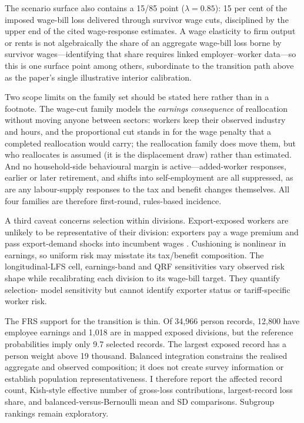 The scenario surface also contains a 15/85 point ($\lambda=0.85$): 15 per cent of the imposed wage-bill loss delivered through survivor wage cuts, disciplined by the upper end of the cited wage-response estimates. A wage elasticity to firm output or rents is not algebraically the share of an aggregate wage-bill loss borne by survivor wages---identifying that share requires linked employer--worker data---so this is one surface point among others, subordinate to the transition path above as the paper's single illustrative interior calibration.

Two scope limits on the family set should be stated here rather than in a footnote. The wage-cut family models the \emph{earnings consequence} of reallocation without moving anyone between sectors: workers keep their observed industry and hours, and the proportional cut stands in for the wage penalty that a completed reallocation would carry; the reallocation family does move them, but who reallocates is assumed (it is the displacement draw) rather than estimated. And no household-side behavioural margin is active---added-worker responses, earlier or later retirement, and shifts into self-employment \citep{irastorza2025} are all suppressed, as are any labour-supply responses to the tax and benefit changes themselves. All four families are therefore first-round, rules-based incidence.

A third caveat concerns selection within divisions. Export-exposed workers are
unlikely to be representative of their division: exporters pay a wage premium
and pass export-demand shocks into incumbent wages
\citep{hummels2014, garinsilverio2024}. Cushioning is nonlinear in earnings,
so uniform risk may misstate its tax/benefit composition. The longitudinal-LFS
cell, earnings-band and QRF sensitivities vary observed risk shape while
recalibrating each division to its wage-bill target. They quantify selection-
model sensitivity but cannot identify exporter status or tariff-specific
worker risk.

The FRS support for the transition is thin. Of 34,966 person records, 12,800
have employee earnings and 1,018 are in mapped exposed divisions, but the
reference probabilities imply only 9.7 selected records. The largest exposed
record has a person weight above 19 thousand. Balanced integration constrains
the realised aggregate and observed composition; it does not create survey
information or establish population representativeness. I therefore report
the affected record count, Kish-style effective number of gross-loss
contributions, largest-record loss share, and balanced-versus-Bernoulli mean
and SD comparisons. Subgroup rankings remain exploratory.

